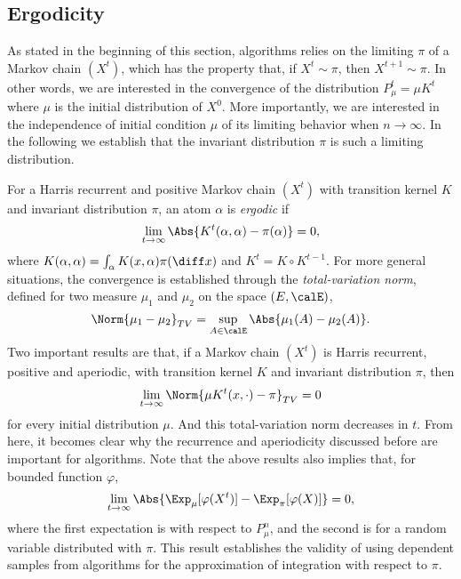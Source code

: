 \subsection{Ergodicity}
\label{sub: Appdendix Ergodicity}

As stated in the beginning of this section, \mcmc algorithms relies on the
limiting $\pi$ of a Markov chain $(X^t)$, which has the property that, if
$X^t\sim\pi$, then $X^{t+1}\sim\pi$. In other words, we are interested in the
convergence of the distribution $P_{\mu}^t = \mu K^t$ where $\mu$ is the
initial distribution of $X^0$. More importantly, we are interested in the
independence of initial condition $\mu$ of its limiting behavior when
$n\to\infty$. In the following we establish that the invariant distribution
$\pi$ is such a limiting distribution.

For a Harris recurrent and positive Markov chain $(X^t)$ with transition
kernel $K$ and invariant distribution $\pi$, an atom $\alpha$ is
\emph{ergodic} if
\begin{equation}
  \lim_{t\to\infty}\Abs{K^t(\alpha,\alpha) - \pi(\alpha)} = 0,
\end{equation}
where $K(\alpha,\alpha) = \int_{\alpha}K(x,\alpha)\pi(\diff x)$ and $K^t =
K\vysmwhtcircle K^{t-1}$. For more general situations, the convergence is
established through the \emph{total-variation norm}, defined for two measure
$\mu_1$ and $\mu_2$ on the space $(E,\calE)$,
\begin{equation}
  \Norm{\mu_1-\mu_2}_{TV} = \sup_{A\in\calE}\Abs{\mu_1(A) - \mu_2(A)}.
\end{equation}
Two important results are that, if a Markov chain $(X^t)$ is Harris recurrent,
positive and aperiodic, with transition kernel $K$ and invariant distribution
$\pi$, then
\begin{equation}
  \lim_{t\to\infty}\Norm{\mu K^t(x,\cdot) - \pi}_{TV} = 0
\end{equation}
for every initial distribution $\mu$. And this total-variation norm decreases
in $t$. From here, it becomes clear why the recurrence and aperiodicity
discussed before are important for \mcmc algorithms. Note that the above
results also implies that, for bounded function $\varphi$,
\begin{equation}
  \lim_{t\to\infty}\Abs{\Exp_{\mu}[\varphi(X^t)] - \Exp_{\pi}[\varphi(X)]}
  = 0,
\end{equation}
where the first expectation is with respect to $P_{\mu}^n$, and the second is
for a random variable distributed with $\pi$. This result establishes the
validity of using dependent samples from \mcmc algorithms for the
approximation of integration with respect to $\pi$.

